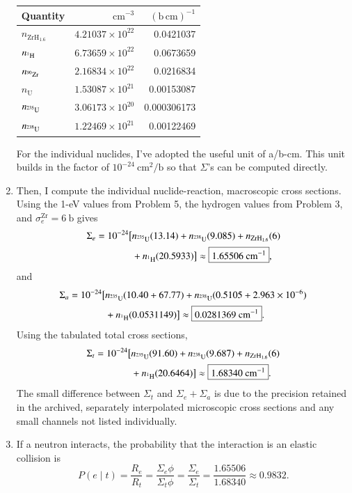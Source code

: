 \begin{draftsolution}
\begin{enumerate}[label=(\alph*)]
\begin{center}
\begin{tabular}{|l|r|r|}
\hline
Quantity&$\mathrm{cm^{-3}}$&$\mathrm{(b\,cm)^{-1}}$\\
\hline
$n_{\mathrm{ZrH}_{1.6}}$&$4.21037\times10^{22}$&0.0421037\\
$n_{\isoA{H}{1}}$&$6.73659\times10^{22}$&0.0673659\\
$n_{\isoA{Zr}{90}}$&$2.16834\times10^{22}$&0.0216834\\
$n_{\mathrm U}$&$1.53087\times10^{21}$&0.00153087\\
$n_{\isoA{U}{235}}$&$3.06173\times10^{20}$&0.000306173\\
$n_{\isoA{U}{238}}$&$1.22469\times10^{21}$&0.00122469\\
\hline
\end{tabular}
\end{center}
For the individual nuclides, I've adopted the useful unit of a/b-cm.  This
unit builds in the factor of $10^{-24}~\mathrm{cm^2/b}$ so that $\Sigma$'s
can be computed directly.

\item Then, I compute the individual nuclide-reaction, macroscopic cross
sections.  Using the 1-eV values from Problem 5, the hydrogen values from
Problem 3, and $\sigma_e^{\mathrm{Zr}}=6~\mathrm b$ gives
\[
\begin{split}
 \Sigma_e=10^{-24}\big[&n_{\isoA{U}{235}}(13.14)
 +n_{\isoA{U}{238}}(9.085)+n_{\mathrm{ZrH}_{1.6}}(6)\\
 &+n_{\isoA{H}{1}}(20.5933)\big]
 \approx\boxed{1.65506~\mathrm{cm^{-1}}},
\end{split}
\]
and
\[
\begin{split}
 \Sigma_a=10^{-24}\big[&n_{\isoA{U}{235}}(10.40+67.77)
 +n_{\isoA{U}{238}}(0.5105+2.963\times10^{-6})\\
 &+n_{\isoA{H}{1}}(0.0531149)\big]
 \approx\boxed{0.0281369~\mathrm{cm^{-1}}}.
\end{split}
\]
Using the tabulated total cross sections,
\[
\begin{split}
 \Sigma_t=10^{-24}\big[&n_{\isoA{U}{235}}(91.60)
 +n_{\isoA{U}{238}}(9.687)+n_{\mathrm{ZrH}_{1.6}}(6)\\
 &+n_{\isoA{H}{1}}(20.6464)\big]
 \approx\boxed{1.68340~\mathrm{cm^{-1}}}.
\end{split}
\]
The small difference between $\Sigma_t$ and $\Sigma_e+\Sigma_a$ is due to
the precision retained in the archived, separately interpolated microscopic
cross sections and any small channels not listed individually.

\item If a neutron interacts, the probability that the interaction is an
elastic collision is
\[
 P(e\mid t)=\frac{R_e}{R_t}=\frac{\Sigma_e\phi}{\Sigma_t\phi}
 =\frac{\Sigma_e}{\Sigma_t}
 =\frac{1.65506}{1.68340}\approx\boxed{0.9832}.
\]


\end{enumerate}
\end{draftsolution}
